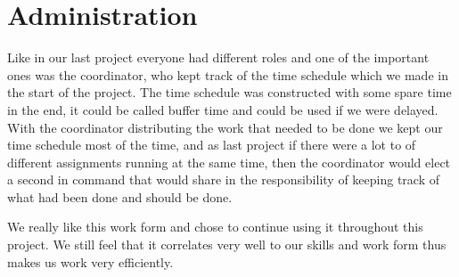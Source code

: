 \section{Administration}
Like in our last project everyone had different roles and one of the important ones was the coordinator, who kept track of the time schedule which we made in the start of the project. The time schedule was constructed with some spare time in the end, it could be called buffer time and could be used if we were delayed. With the coordinator distributing the work that needed to be done we kept our time schedule most of the time, and as last project if there were a lot to of different assignments running at the same time, then the coordinator would elect a second in command that would share in the responsibility of keeping track of what had been done and should be done.

We really like this work form and chose to continue using it throughout this project. We still feel that it correlates very well to our skills and work form thus makes us work very efficiently.